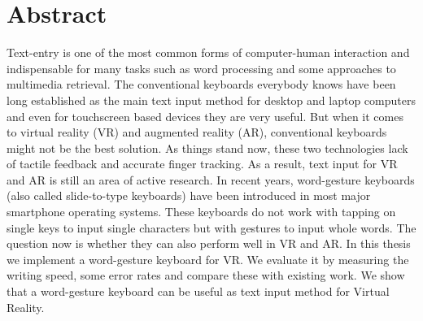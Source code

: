 \chapter{Abstract}
Text-entry is one of the most common forms of computer-human interaction and indispensable for many tasks such as word processing and some approaches to multimedia retrieval. The conventional keyboards everybody knows have been long established as the main text input method for desktop and laptop computers and even for touchscreen based devices they are very useful. But when it comes to virtual reality (VR) and augmented reality (AR), conventional keyboards might not be the best solution. As things stand now, these two technologies lack of tactile feedback and accurate finger tracking. As a result, text input for VR and AR is still an area of active research. In recent years, word-gesture keyboards (also called slide-to-type keyboards) have been introduced in most major smartphone operating systems. These keyboards do not work with tapping on single keys to input single characters but with gestures to input whole words. The question now is whether they can also perform well in VR and AR. In this thesis we implement a word-gesture keyboard for VR. We evaluate it by measuring the writing speed, some error rates and compare these with existing work. We show that a word-gesture keyboard can be useful as text input method for Virtual Reality.